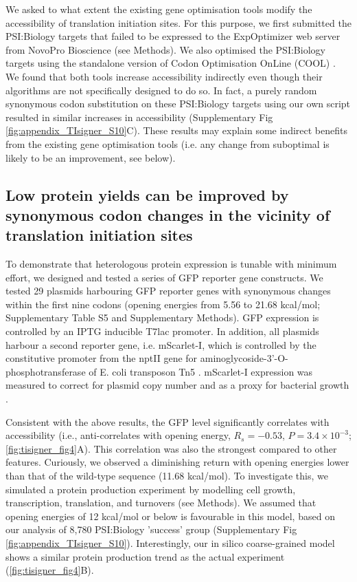 We asked to what extent the existing gene optimisation tools modify the accessibility of translation initiation sites. For this purpose, we first submitted the PSI:Biology targets that failed to be expressed to the ExpOptimizer web server from NovoPro Bioscience (see Methods). We also optimised the PSI:Biology targets using the standalone version of Codon Optimisation OnLine (COOL) \cite{Chung2012-zh}. We found that both tools increase accessibility indirectly even though their algorithms are not specifically designed to do so. In fact, a purely random synonymous codon substitution on these PSI:Biology targets using our own script resulted in similar increases in accessibility (Supplementary Fig \ref{fig:appendix_TIsigner_S10}C). These results may explain some indirect benefits from the existing gene optimisation tools (i.e. any change from suboptimal is likely to be an improvement, see below).

\subsection{Low protein yields can be improved by synonymous codon changes in the vicinity of translation initiation sites}
To demonstrate that heterologous protein expression is tunable with minimum effort, we designed and tested a series of GFP reporter gene constructs. We tested 29 plasmids harbouring GFP reporter genes with synonymous changes within the first nine codons (opening energies from 5.56 to 21.68 kcal/mol; Supplementary Table S5 and Supplementary Methods). GFP expression is controlled by an IPTG inducible T7lac promoter. In addition, all plasmids harbour a second reporter gene, i.e. mScarlet-I, which is controlled by the constitutive promoter from the nptII gene for aminoglycoside-3'-O-phosphotransferase of E. coli transposon Tn5 \cite{Bindels2017-ud,Schlechter2018-nj}. mScarlet-I expression was measured to correct for plasmid copy number and as a proxy for bacterial growth \cite{Schlechter2020-ab}. 

Consistent with the above results, the GFP level significantly correlates with accessibility (i.e., anti-correlates with opening energy, $R_s=−0.53$, $P=3.4\times 10^{-3}$; \ref{fig:tisigner_fig4}A). This correlation was also the strongest compared to other features. Curiously, we observed a diminishing return with opening energies lower than that of the wild-type sequence (11.68 kcal/mol). To investigate this, we simulated a protein production experiment by modelling cell growth, transcription, translation, and turnovers (see Methods). We assumed that opening energies of 12 kcal/mol or below is favourable in this model, based on our analysis of 8,780 PSI:Biology 'success' group (Supplementary Fig \ref{fig:appendix_TIsigner_S10}). Interestingly, our in silico coarse-grained model shows a similar protein production trend as the actual experiment (\ref{fig:tisigner_fig4}B).

